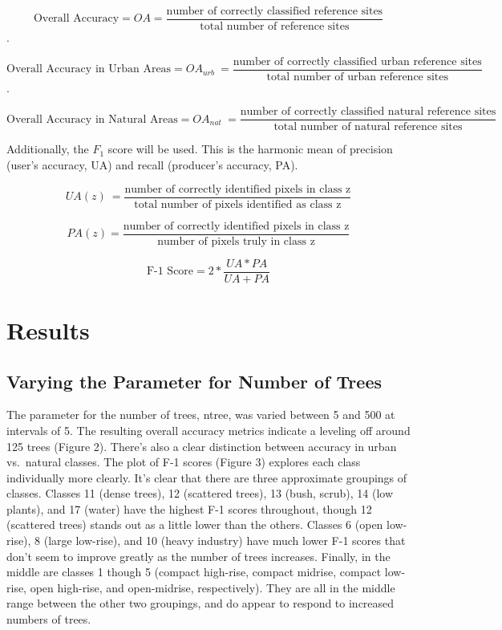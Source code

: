 \documentclass[
]{article}
\begin{document}
\[
\text{Overall Accuracy}= OA= \frac{\text{number of correctly classified reference sites}}{\text{total number of reference sites}}
\] .

\[
\text{Overall Accuracy in Urban Areas} = OA_{urb}\ = \frac{\text{number of correctly classified urban reference sites}}{\text{total number of urban reference sites}}
\] .

\[
\text{Overall Accuracy in Natural Areas}=OA_{nat}\ = \frac{\text{number of correctly classified natural reference sites}}{\text{total number of natural reference sites}}
\]

Additionally, the \(F_1\) score will be used. This is the harmonic mean
of precision (user's accuracy, UA) and recall (producer's accuracy, PA).

\[
UA(z)\ = \frac{\text{number of correctly identified pixels in class z}}{\text{total number of pixels identified as class z}}
\]

\[
PA(z) = \frac{\text{number of correctly identified pixels in class z}}{\text{number of pixels truly in class z}}
\]

\[
\text{F-1 Score} = 2*\frac{UA*PA}{UA+PA}
\]

\hypertarget{results}{%
\section{Results}\label{results}}

\hypertarget{varying-the-parameter-for-number-of-trees}{%
\subsection{Varying the Parameter for Number of
Trees}\label{varying-the-parameter-for-number-of-trees}}

The parameter for the number of trees, ntree, was varied between 5 and
500 at intervals of 5. The resulting overall accuracy metrics indicate a
leveling off around 125 trees (Figure 2). There's also a clear
distinction between accuracy in urban vs.~natural classes. The plot of
F-1 scores (Figure 3) explores each class individually more clearly.
It's clear that there are three approximate groupings of classes.
Classes 11 (dense trees), 12 (scattered trees), 13 (bush, scrub), 14
(low plants), and 17 (water) have the highest F-1 scores throughout,
though 12 (scattered trees) stands out as a little lower than the
others. Classes 6 (open low-rise), 8 (large low-rise), and 10 (heavy
industry) have much lower F-1 scores that don't seem to improve greatly
as the number of trees increases. Finally, in the middle are classes 1
though 5 (compact high-rise, compact midrise, compact low-rise, open
high-rise, and open-midrise, respectively). They are all in the middle
range between the other two groupings, and do appear to respond to
increased numbers of trees.
\end{document}
